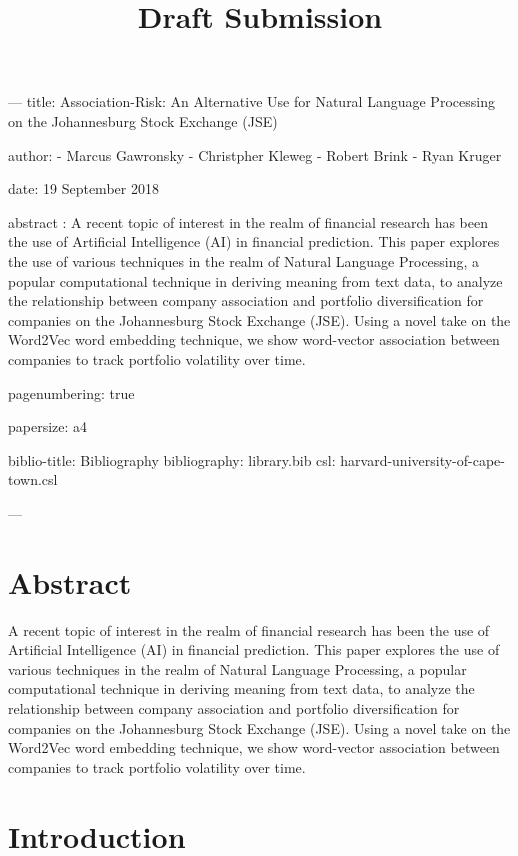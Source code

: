 \documentclass[11pt]{article}
\title{Draft Submission}
\begin{document}
    
    
    \maketitle
    
    

    ---
title: Association-Risk: An Alternative Use for Natural Language Processing on the Johannesburg Stock Exchange (JSE)

author:
- Marcus Gawronsky
- Christpher Kleweg
- Robert Brink
- Ryan Kruger

date: 19 September 2018

abstract : A recent topic of interest in the realm of financial research has been the use of Artificial Intelligence (AI) in financial prediction. This paper explores the use of various techniques in the realm of Natural Language Processing, a popular computational technique in deriving meaning from text data, to analyze the relationship between company association and portfolio diversification for companies on the Johannesburg Stock Exchange (JSE). Using a novel take on the Word2Vec word embedding technique, we show word-vector association between companies to track portfolio volatility over time. 

pagenumbering: true


papersize: a4

biblio-title: Bibliography   
bibliography: library.bib
csl: harvard-university-of-cape-town.csl

---
    \hypertarget{abstract}{%
\section{Abstract}\label{abstract}}

A recent topic of interest in the realm of financial research has been
the use of Artificial Intelligence (AI) in financial prediction. This
paper explores the use of various techniques in the realm of Natural
Language Processing, a popular computational technique in deriving
meaning from text data, to analyze the relationship between company
association and portfolio diversification for companies on the
Johannesburg Stock Exchange (JSE). Using a novel take on the Word2Vec
word embedding technique, we show word-vector association between
companies to track portfolio volatility over time.

\hypertarget{introduction}{%
\section{Introduction}\label{introduction}}
\end{document}
